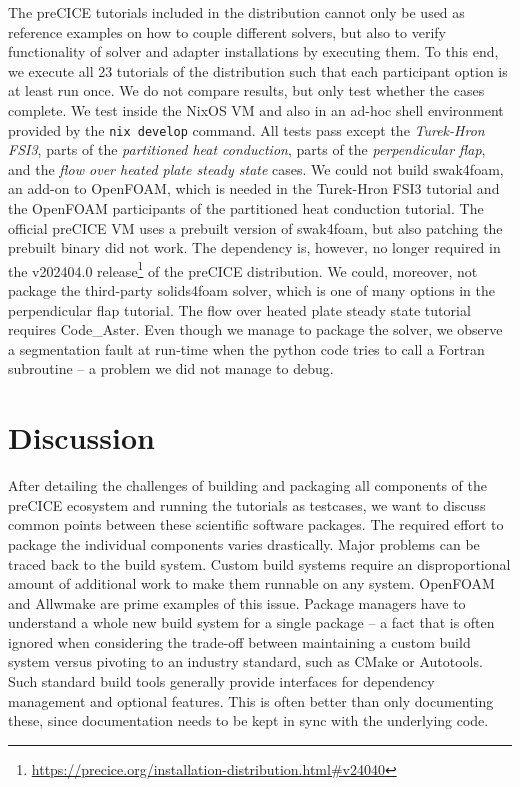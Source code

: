 \documentclass{eceasst}
\begin{document}
The preCICE tutorials included in the distribution cannot only be used as reference examples on how to couple different solvers, but also to verify functionality of solver and adapter installations by executing them.
To this end, we execute all 23 tutorials of the distribution such that each participant option is at least run once. We do not compare results, but only test whether the cases complete.
We test inside the NixOS VM and also in an ad-hoc shell environment provided by the \texttt{nix develop} command. All tests pass except the \textit{Turek-Hron FSI3}, parts of the \textit{partitioned heat conduction}, parts of the \textit{perpendicular flap}, and the \textit{flow over heated plate steady state} cases.
We could not build swak4foam, an add-on to OpenFOAM, which is needed in the Turek-Hron FSI3 tutorial and the OpenFOAM participants of the partitioned heat conduction tutorial.
The official preCICE VM uses a prebuilt version of swak4foam, but also patching the prebuilt binary did not work.
The dependency is, however, no longer required in the v202404.0 release\footnote{\url{https://precice.org/installation-distribution.html\#v24040}} of the preCICE distribution.
We could, moreover, not package the third-party solids4foam solver, which is one of many options in the perpendicular flap tutorial.
The flow over heated plate steady state tutorial requires Code\_Aster. Even though we manage to package the solver, we observe a segmentation fault at run-time when the python code tries to call a Fortran subroutine -- a problem we did not manage to debug.


\section{Discussion}
\label{sec:discussion}

After detailing the challenges of building and packaging all components of the preCICE ecosystem and running the tutorials as testcases, we want to discuss common points between these scientific software packages.
The required effort to package the individual components varies drastically. Major problems can be traced back to the build system.
Custom build systems require an disproportional amount of additional work to make them runnable on any system.
OpenFOAM and Allwmake are prime examples of this issue. Package managers have to understand a whole new build system for a single package -- a fact that is often ignored when considering the trade-off between maintaining a custom build system versus pivoting to an industry standard, such as CMake or Autotools.
Such standard build tools generally provide interfaces for dependency management and optional features. This is often better than only documenting these, since documentation needs to be kept in sync with the underlying code.
\end{document}
